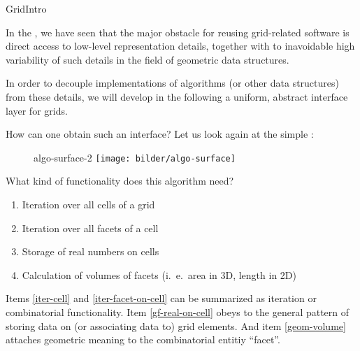 
\begin{Label}{GridIntro}
\end{Label} 

  In the ,
  we have seen that the major obstacle for reusing grid-related software
  is direct access to low-level representation details,
  together with to inavoidable high variability of such details
  in the field of geometric data structures.

  In order to  decouple implementations of algorithms 
  (or other data structures)
  from these details, we will develop in the following 
  a uniform, abstract interface layer for grids.

  How can one obtain such an interface? 
  Let us look again at the simple 
  :

   \begin{figure}[h]
     \begin{center}
       \begin{Label}{algo-surface-2}
       \T\texttt{[image: bilder/algo-surface]}
       \W{}
        \end{Label}
     \end{center}
   \end{figure}

   What kind of functionality does this algorithm need?
   \begin{enumerate}
   \item \label{iter-cell} Iteration over all cells of a grid
   \item \label{iter-facet-on-cell} Iteration over all facets of a cell
   \item \label{gf-real-on-cell} Storage of real numbers on cells
   \item \label{geom-volume} Calculation of volumes of  facets 
     (i.\ e.\ area in 3D, length in 2D)
   \end{enumerate}
  
   Items \ref{iter-cell} and \ref{iter-facet-on-cell} 
   can be summarized as iteration or combinatorial functionality.
   Item \ref{gf-real-on-cell} obeys to the general pattern of storing
   data on (or associating data to) grid elements.
   And item \ref{geom-volume} attaches geometric meaning to the combinatorial
   entitiy ``facet''.

